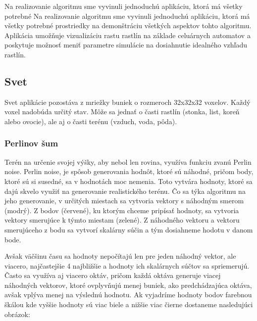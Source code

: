 \documentclass[12pt]{article}
\begin{document}
Na realizovanie algoritmu sme vyvinuli jednoduchú aplikáciu, ktorá má všetky
potrebné Na realizovanie algoritmu sme vyvinuli jednoduchú aplikáciu, ktorá má
všetky potrebné prostriedky na demonštráciu všetkých aspektov tohto algoritmu.
Aplikácia umožňuje vizualizáciu rastu rastlín na základe celuárnych automatov
a poskytuje možnosť meniť parametre simulácie na dosiahnutie idealného vzhľadu
rastlín.

\subsection{Svet}

Svet aplikácie pozostáva z mriežky buniek o rozmeroch 32x32x32 voxelov.
Každý voxel nadobúda určitý stav. Môže sa jednať o časti rastlín (stonka, list,
koreň alebo ovocie), ale aj o časti terénu (vzduch, voda, pôda).

\subsubsection{Perlinov šum}

Terén na určenie svojej výšky, aby nebol len rovina, využíva funkciu zvanú
Perlin noise. Perlin noise, je spôsob generovania hodnôt, ktoré sú náhodné,
pričom body, ktoré sú si susedné, sa v hodnotách moc nemenia. Toto vytvára
hodnoty, ktoré sa dajú skvelo využiť na generovanie realistického terénu.
Čo sa týka algoritmu na jeho generovanie, v určitých miestach sa vytvoria
vektory s náhodným smerom (modrý). Z bodov (červené), ku ktorým chceme pripísať
hodnoty, sa vytvoria vektory smerujúce k týmto miestam (zelené). Z náhodného
vektoru a vektoru smerujúceho z bodu sa vytvorí skalárny súčin a tým dosiahneme
hodotu v danom bode.

Avšak väčšinu času sa hodnoty nepočítajú len pre jeden náhodný vektor,
ale viacero, najčastejšie 4 najbližšie a hodnoty ich skalárnych súčtov
sa spriemerujú. Často sa využíva aj viacero oktáv, pričom každá oktáva generuje
viacej náhodných vektorov, ktoré ovplyvňujú menej buniek, ako predchádzajúca
oktáva, avšak vplýva menej na výslednú hodnotu. Ak vyjadríme hodnoty bodov
farebnou škálou kde vyššie hodnoty sú viac biele a nižšie viac čierne dostaneme
nasledujúci obrázok:
\end{document}
